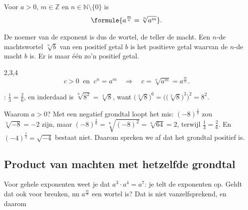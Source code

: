 \begin{theorie}
Voor $a > 0$, $m \in \mathbb{Z}$ en $n \in \mathbb{N} \setminus \{0\}$ is
\[\formule{a^{\frac{m}{n}} = \sqrt[n]{a^m}}.\]
\end{theorie}

De noemer van de exponent is dus de wortel, de teller de macht. Een $n$-de machtswortel $\sqrt[n]{b}$ van een positief getal $b$ is het positieve getal waarvan de $n$-de macht $b$ is. Er is maar één zo'n positief getal.
\begin{alleenvoor}{2,3,4}
\[c > 0 \ \text{ en } \ c^n = a^m \quad \Longrightarrow \quad c = \sqrt[n]{a^m} = a^{\frac{m}{n}} .\]
\end{alleenvoor}
: $\frac13 = \frac26$, en inderdaad is $\sqrt[6]{8^2} = \sqrt[3]{8}$, want $\bigl(\sqrt[3]{8}\bigr)^6 = \bigl(\bigl(\sqrt[3]{8}\bigr)^3\bigr)^2 = 8^2$.

Waarom $a > 0$? Met een negatief grondtal loopt het mis: $(-8)^{\frac13}$ zou $\sqrt[3]{-8} = -2$ zijn, maar $(-8)^{\frac26} = \sqrt[6]{(-8)^2} = \sqrt[6]{64} = 2$, terwijl $\frac13 = \frac26$. En $(-4)^{\frac12} = \sqrt{-4}$ bestaat niet. Daarom spreken we af dat het grondtal positief is.


\begin{oefeningen}
\end{oefeningen}

\subsection{Product van machten met hetzelfde grondtal}

Voor gehele exponenten weet je dat $a^3 \cdot a^4 = a^7$: je telt de exponenten op. Geldt dat ook voor breuken, nu $a^{\frac{m}{n}}$ een wortel is? Dat is niet vanzelfsprekend, en daarom 

